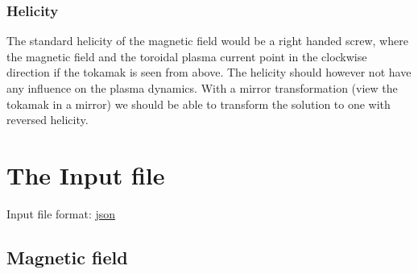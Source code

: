 \subsubsection{Helicity}
The standard helicity of the magnetic field would be a right handed screw,
where the magnetic field and the toroidal plasma current point in the clockwise
direction if the tokamak is seen from above.
The helicity should however not have any influence on the plasma dynamics. With
a mirror transformation (view the tokamak in a mirror) we should be able
to transform the solution to one with reversed helicity.

\section{The Input file} \label{sec:input_file}
Input file format: \href{https://en.wikipedia.org/wiki/JSON}{json}

\subsection{Magnetic field} \label{sec:geometry_file}

